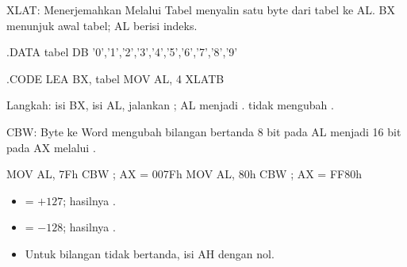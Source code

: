 \documentclass[aspectratio=169,11pt]{beamer}
\begin{document}

\begin{frame}[fragile]{XLAT: Menerjemahkan Melalui Tabel}
\small
{} menyalin satu byte dari tabel ke AL. BX menunjuk awal
tabel; AL berisi indeks.

\vspace{0.2em}
\begin{kodeasm}[numbers=none]
.DATA
    tabel DB '0','1','2','3','4','5','6','7','8','9'

.CODE
    LEA BX, tabel
    MOV AL, 4
    XLATB
\end{kodeasm}

\vspace{0.15em}
Langkah: isi BX, isi AL, jalankan ; AL menjadi
.  tidak mengubah .
\end{frame}

\begin{frame}[fragile]{CBW: Byte ke Word}
\small
{} mengubah bilangan bertanda 8 bit pada AL menjadi 16 bit
pada AX melalui .

\vspace{0.2em}
\begin{kodeasm}[numbers=none]
MOV AL, 7Fh
CBW                 ; AX = 007Fh
MOV AL, 80h
CBW                 ; AX = FF80h
\end{kodeasm}

\vspace{0.15em}
\begin{itemize}
    \item {} = $+127$; hasilnya .
    \item {} = $-128$; hasilnya .
    \item Untuk bilangan tidak bertanda, isi AH dengan nol.
\end{itemize}
\end{frame}
\end{document}

